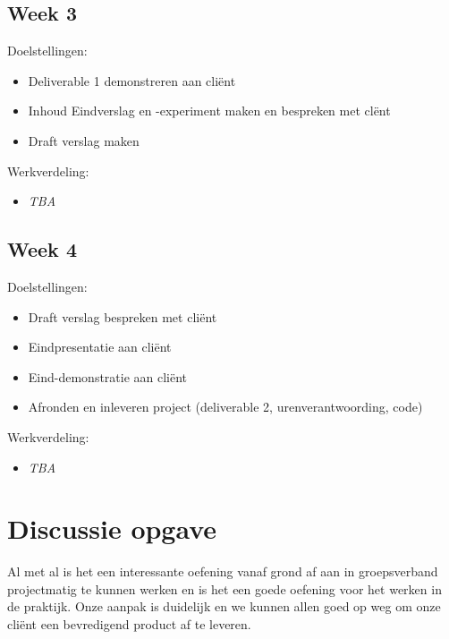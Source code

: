 \documentclass[a4paper, 11pt]{article}
\begin{document}
  \subsection*{Week 3}
    Doelstellingen:
    \begin{itemize}
        \item Deliverable 1 demonstreren aan cli\"ent
        \item Inhoud Eindverslag en -experiment maken en bespreken met cl\"ent
        \item Draft verslag maken
    \end{itemize}
    Werkverdeling:
    \begin{itemize}
        \item \emph{TBA}
    \end{itemize}

  \subsection*{Week 4}
    Doelstellingen:
    \begin{itemize}
        \item Draft verslag bespreken met cli\"ent
        \item Eindpresentatie aan cli\"ent
        \item Eind-demonstratie aan cli\"ent
        \item Afronden en inleveren project (deliverable 2, urenverantwoording, code)
    \end{itemize}
    Werkverdeling:
    \begin{itemize}
        \item \emph{TBA}
    \end{itemize}
    
\section*{Discussie opgave}
  Al met al is het een interessante oefening vanaf grond af aan in groepsverband projectmatig te kunnen werken en
  is het een goede oefening voor het werken in de praktijk. Onze aanpak is duidelijk en we kunnen allen goed op weg
  om onze cli\"ent een bevredigend product af te leveren.
\end{document}
